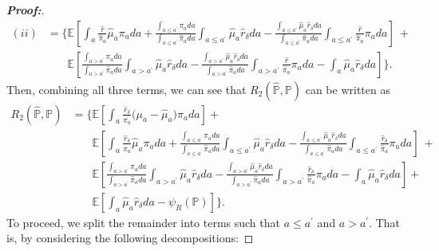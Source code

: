 \documentclass[11pt,twoside]{article}
\theoremstyle{definition}
\theoremstyle{remark}
\begin{document}
\begin{proof}[\textbf{Proof:}]
\begin{align*}
    (ii) &= \Bigg\{ \mathbb{E} \left[ \int_a \frac{\widehat{r}}{\widehat{\pi}_a} \widehat{\mu}_a \pi_a da + \frac{ \int_{a \leq a^{\prime}}  \pi_a da}{\int_{a \leq a^{\prime}}  \widehat{\pi}_a da}  \int_{a \leq a^{\prime}}  \widehat{\mu}_a \widehat{r}_\delta da -  \frac{\int_{a \leq a^{\prime}}  \widehat{\mu}_a \widehat{r}_\delta da}{\int_{a \leq a^{\prime}}  \widehat{\pi}_a da} \int_{a \leq a^{\prime}} \frac{\widehat{r}  }{\widehat{\pi}_a} \pi_a da \right]\ + \\
    &\phantom{{}={\Bigg\{ }} \mathbb{E}\left[\frac{ \int_{a > a^{\prime}}  \pi_a da}{\int_{a > a^{\prime}}  \widehat{\pi}_a da}  \int_{a > a^{\prime}}  \widehat{\mu}_a \widehat{r}_\delta da -  \frac{\int_{a > a^{\prime}}  \widehat{\mu}_a \widehat{r}_\delta da }{\int_{a > a^{\prime}}  \widehat{\pi}_a da} \int_{a > a^{\prime}} \frac{\widehat{r}  }{\widehat{\pi}_a} \pi_a da   -  \int_a \widehat{\mu}_a \widehat{r}_\delta da  \right] \Bigg\} .
\end{align*}
Then, combining all three terms, we can see that $R_2(\widehat{\mathbb{P}}, \mathbb{P})$ can be written as
\begin{align*}
    R_2(\widehat{\mathbb{P}}, \mathbb{P}) &=  \Bigg\{ \mathbb{E}\left[\int_a \frac{\widehat{r}_\delta}{\widehat{\pi}_a} \Big(\mu_a - \widehat{\mu}_a \Big) \pi_a da\right] + \\
    &\phantom{{}={\Bigg\{}} \mathbb{E} \left[ \int_a \frac{\widehat{r}_{\delta}}{\widehat{\pi}_a} \widehat{\mu}_a \pi_a da + \frac{ \int_{a \leq a^{\prime}}  \pi_a da}{\int_{a \leq a^{\prime}}  \widehat{\pi}_a da}  \int_{a \leq a^{\prime}}  \widehat{\mu}_a \widehat{r}_\delta da -  \frac{\int_{a \leq a^{\prime}}  \widehat{\mu}_a \widehat{r}_\delta da}{\int_{a \leq a^{\prime}}  \widehat{\pi}_a da} \int_{a \leq a^{\prime}} \frac{\widehat{r}_{\delta}  }{\widehat{\pi}_a} \pi_a da \right]\ + \\
    &\phantom{{}={\Bigg\{}} \mathbb{E}\left[\frac{ \int_{a > a^{\prime}}  \pi_a da}{\int_{a > a^{\prime}}  \widehat{\pi}_a da}  \int_{a > a^{\prime}}  \widehat{\mu}_a \widehat{r}_\delta da -  \frac{\int_{a > a^{\prime}}  \widehat{\mu}_a \widehat{r}_\delta da}{\int_{a > a^{\prime}}  \widehat{\pi}_a da} \int_{a > a^{\prime}} \frac{\widehat{r}_{\delta}  }{\widehat{\pi}_a} \pi_a da   -  \int_a \widehat{\mu}_a \widehat{r}_\delta da  \right] + \\
    &\phantom{{}={\Bigg\{}} \mathbb{E}\left[\int_a \widehat{\mu}_a \widehat{r}_\delta da  - \psi_R(\mathbb{P}) \right] \Bigg\} .
\end{align*}
To proceed, we split the remainder into terms such that $a \leq a^{\prime}$ and $a > a^{\prime}$. That is, by considering the following decompositions:

\end{proof}
\end{document}
